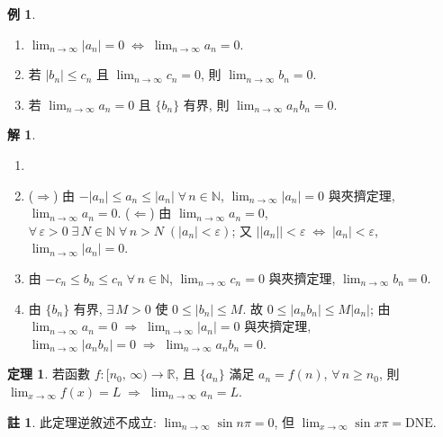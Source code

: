 \documentclass[12pt]{extarticle}
\newcommand{\ds}{\displaystyle}
\newcommand{\ie}{\;\Longrightarrow\;}
\newcommand{\ifff}{\;\Longleftrightarrow\;}
\theoremstyle{definition}
\newtheorem*{thm}{定理}
\newtheorem*{ex}{例}
\newtheorem*{sol}{解}
\newtheorem*{rmk}{註}
\begin{document}
\begin{ex}
  \begin{multicols}{2}
    \begin{enumerate}\setlength\itemsep{0em}
      \item $\ds\lim_{n\to\infty} |a_n| = 0 \ifff \lim_{n\to\infty} a_n = 0$. 
      \item 若 $\ds |b_n|\leqslant c_n$ 且 $\ds\lim_{n\to\infty} c_n = 0$, 則 $\ds\lim_{n\to\infty} b_n = 0$. 
      \item 若 $\ds\lim_{n\to\infty} a_n = 0$ 且 $\ds\{b_n\}$ 有界, 則 $\ds\lim_{n\to\infty} a_n b_n = 0$. 
    \end{enumerate}
  \end{multicols}
\end{ex}

\begin{sol}
  \begin{enumerate}\setlength\itemsep{0em}
    \item[]
    \item ($\Longrightarrow$) 由 $\ds -|a_n| \leqslant a_n \leqslant |a_n|\;\forall\,n\in\mathbb{N}$, $\ds\lim_{n\to\infty} |a_n| = 0$ 與夾擠定理, $\ds\lim_{n\to\infty} a_n = 0$. ($\Longleftarrow$) 由 $\ds\lim_{n\to\infty} a_n = 0$, $\forall\,\varepsilon > 0\;\exists\,N\in\mathbb{N}\;\forall\,n > N\;(|a_n| < \varepsilon)$; 又 $\ds||a_n|| < \varepsilon \ifff |a_n| < \varepsilon$, $\ds\lim_{n\to\infty} |a_n| = 0$. 
    \item 由 $\ds -c_n \leqslant b_n \leqslant c_n\;\forall\,n\in\mathbb{N}$, $\ds\lim_{n\to\infty} c_n = 0$ 與夾擠定理, $\ds\lim_{n\to\infty} b_n = 0$. 
    \item 由 $\{b_n\}$ 有界, $\exists\,M > 0$ 使 $0\leqslant |b_n|\leqslant M$. 故 $0\leqslant |a_n b_n|\leqslant M |a_n|$; 由 $\ds\lim_{n\to\infty} a_n = 0 \ie \lim_{n\to\infty} |a_n| = 0$ 與夾擠定理, $\ds\lim_{n\to\infty} |a_n b_n| = 0 \ie \lim_{n\to\infty} a_n b_n = 0$. 
  \end{enumerate}
\end{sol}

\begin{thm}
  若函數 $\ds f: [n_0,\,\infty)\to\mathbb{R}$, 且 $\{a_n\}$ 滿足 $a_n = f(n)$, $\forall\,n\geqslant n_0$, 則 $\ds\lim_{x\to\infty}f(x) = L\ie\lim_{n\to\infty} a_n = L$.  
\end{thm}

\begin{rmk}
  此定理逆敘述不成立: $\ds\lim_{n\to\infty}\sin n\pi = 0$, 但 $\ds\lim_{x\to\infty}\sin x\pi = \text{DNE}$.   
\end{rmk}
\end{document}

